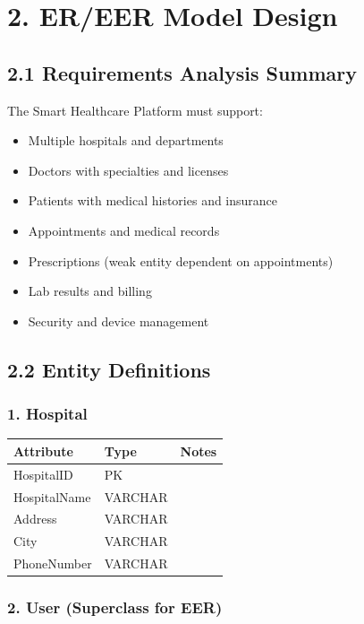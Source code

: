 \newpage
\section{2. ER/EER Model Design}

\subsection*{2.1 Requirements Analysis Summary}

The Smart Healthcare Platform must support:
\begin{itemize}
    \item Multiple hospitals and departments
    \item Doctors with specialties and licenses
    \item Patients with medical histories and insurance
    \item Appointments and medical records
    \item Prescriptions (weak entity dependent on appointments)
    \item Lab results and billing
    \item Security and device management
\end{itemize}

\subsection*{2.2 Entity Definitions}

\subsubsection*{1. Hospital}

\begin{tabular}{lll}
\textbf{Attribute} & \textbf{Type} & \textbf{Notes} \\
\hline
HospitalID & PK & \\
HospitalName & VARCHAR & \\
Address & VARCHAR & \\
City & VARCHAR & \\
PhoneNumber & VARCHAR & \\
\end{tabular}

\subsubsection*{2. User (Superclass for EER)}

